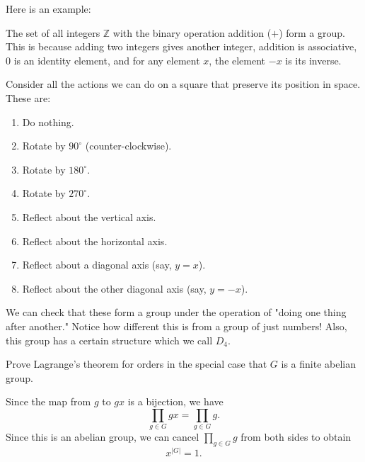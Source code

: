 \documentclass{scrartcl}
\begin{document}
Here is an example:
\begin{example}
    The set of all integers $\mathbb{Z}$ with the binary operation addition ($+$) form a group.
    This is because adding two integers gives another integer,
    addition is associative,
    $0$ is an identity element,
    and for any element $x$, the element $-x$ is its inverse.
\end{example}
\begin{example}
    Consider all the actions we can do on a square that preserve its position in space.
    These are:
    \begin{enumerate}
        \item Do nothing.
        \item Rotate by $90^\circ$ (counter-clockwise).
        \item Rotate by $180^\circ$.
        \item Rotate by $270^\circ$.
        \item Reflect about the vertical axis.
        \item Reflect about the horizontal axis.
        \item Reflect about a diagonal axis (say, $y=x$).
        \item Reflect about the other diagonal axis (say, $y=-x$).
    \end{enumerate}
    We can check that these form a group under the operation of "doing one thing after another."
    Notice how different this is from a group of just numbers!
    Also, this group has a certain structure which we call $D_4$.
\end{example}

\begin{problem}
    Prove Lagrange's theorem for orders in the special case that $G$ is a finite abelian group.
\end{problem}
\begin{soln}
    Since the map from $g$ to $gx$ is a bijection, we have
    \[ \prod_{g \in G} gx = \prod_{g \in G} g. \]
    Since this is an abelian group, we can cancel $\prod_{g \in G} g$ from both sides
    to obtain
    \[ x^{|G|} = 1. \]
\end{soln}
\end{document}
